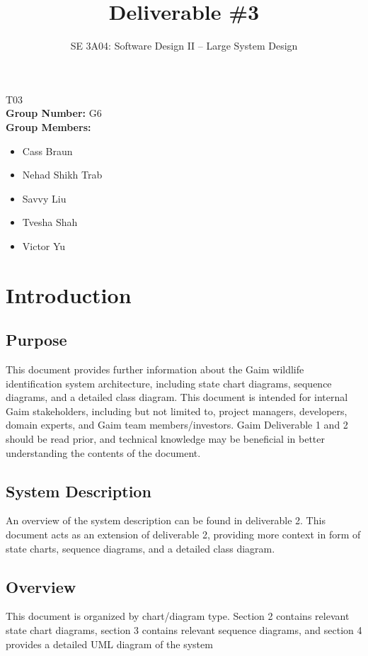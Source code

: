 \documentclass[]{article}
\title{Deliverable \#3}
\author{SE 3A04: Software Design II -- Large System Design}
\date{}
\numberwithin{figure}{section}
\begin{document}
\maketitle	
{} T03\\
{\bf Group Number:} G6 \\
{\bf Group Members:} 
\begin{itemize}
	\item Cass Braun
	\item Nehad Shikh Trab
	\item Savvy Liu
	\item Tvesha Shah
	\item Victor Yu
\end{itemize}

\section{Introduction}
\label{sec:introduction}

\subsection{Purpose}
\label{sub:purpose}
This document provides further information about the Gaim wildlife identification system architecture, including
state chart diagrams, sequence diagrams, and a detailed class diagram.
This document is intended for internal Gaim stakeholders, including but not limited to, project managers,
developers, domain experts, and Gaim team members/investors. Gaim Deliverable 1 and 2 should be
read prior, and technical knowledge may be beneficial in better understanding the contents of the document.

\subsection{System Description}
\label{sub:system_description}
An overview of the system description can be found in deliverable 2. This document acts as an extension
of deliverable 2, providing more context in form of state charts, sequence diagrams, and a detailed class
diagram.

\subsection{Overview}
\label{sub:overview}
This document is organized by chart/diagram type. Section 2 contains relevant state chart diagrams, section
3 contains relevant sequence diagrams, and section 4 provides a detailed UML diagram of the system
\clearpage 
\end{document}
